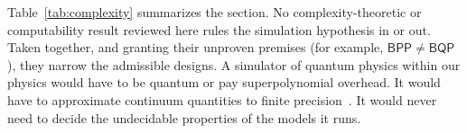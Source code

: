 Table~\ref{tab:complexity} summarizes the section. No complexity-theoretic or
computability result reviewed here rules the simulation hypothesis in or out.
Taken together, and granting their unproven premises (for example,
$\mathsf{BPP}\neq\mathsf{BQP}$), they narrow the admissible designs. A
simulator of quantum physics within our physics would have to be quantum or
pay superpolynomial overhead. It would have to approximate continuum quantities
to finite precision~\cite{Lloyd1996universal,Aaronson2005np}. It would never need to decide the undecidable properties
of the models it runs.

